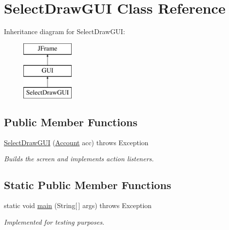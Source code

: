 \hypertarget{class_select_draw_g_u_i}{}\section{Select\+Draw\+G\+UI Class Reference}
\label{class_select_draw_g_u_i}
Inheritance diagram for Select\+Draw\+G\+UI\+:\begin{figure}[H]
\begin{center}
\leavevmode
\includegraphics[height=3.000000cm]{class_select_draw_g_u_i}
\end{center}
\end{figure}
\subsection*{Public Member Functions}
\begin{DoxyCompactItemize}
\item 
\hyperlink{class_select_draw_g_u_i_a5437524cbdb011b9afd066ed51a8830d}{Select\+Draw\+G\+UI} (\hyperlink{class_account}{Account} acc)  throws Exception 
\begin{DoxyCompactList}\small\item\em Builds the screen and implements action listeners. \end{DoxyCompactList}\end{DoxyCompactItemize}
\subsection*{Static Public Member Functions}
\begin{DoxyCompactItemize}
\item 
\mbox{\label{class_select_draw_g_u_i_abb206d6887f59cabc6f1b0c16cdb2522}} 
static void \hyperlink{class_select_draw_g_u_i_abb206d6887f59cabc6f1b0c16cdb2522}{main} (String\mbox{[}$\,$\mbox{]} args)  throws Exception 	
\begin{DoxyCompactList}\small\item\em Implemented for testing purposes. \end{DoxyCompactList}\end{DoxyCompactItemize}


